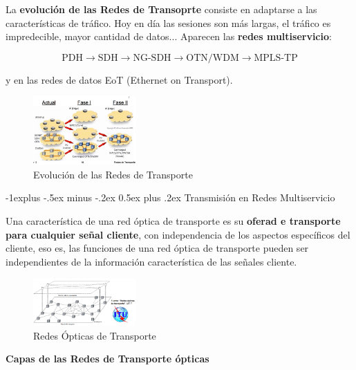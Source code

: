\documentclass[10pt,portrait, twocolumn]{article}
\makeatletter
\renewcommand{\subsection}{\@startsection{subsection}{2}{0mm}%
                                {-1explus -.5ex minus -.2ex}%
                                {0.5ex plus .2ex}%
                                {\normalfont\normalsize\bfseries}}
\makeatother
\begin{document}
La \textbf{evolución de las Redes de Transoprte} consiste en adaptarse a las características de tráfico. Hoy en día las sesiones son más largas, el tráfico es impredecible, mayor cantidad de datos... Aparecen las \textbf{redes multiservicio}:

	\begin{equation*}
	\text{PDH} \rightarrow \text{SDH} \rightarrow \text{NG-SDH} \rightarrow \text{OTN/WDM} \rightarrow \text{MPLS-TP}
	\end{equation*}
	
y en las redes de datos EoT (Ethernet on Transport).

\begin{figure}[h]
	\centering
     \includegraphics[width=0.35\textwidth]{EvolucionRdT}
      \caption{Evolución de las Redes de Transporte}
      \label{fig:Regiones de frecuencias}
  \end{figure}

\subsection{Transmisión en Redes Multiservicio}

Una característica de una red óptica de transporte es su \textbf{oferad e transporte para cualquier señal cliente}, con independencia de los aspectos específicos del cliente, eso es, las funciones de una red óptica de transporte pueden ser independientes de la información característica de las señales cliente.

\begin{figure}[h]
	\centering
     \includegraphics[width=0.35\textwidth]{RdT}
      \caption{Redes Ópticas de Transporte}
      \label{fig:Regiones de frecuencias}
  \end{figure}
 
 \textbf{Capas de las Redes de Transporte ópticas}\\
  
\end{document}
